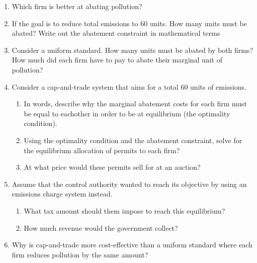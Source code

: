\documentclass[11pt]{article}
\begin{document}
\begin{enumerate}
  \item Which firm is better at abating pollution?
  
  \item If the goal is to reduce total emissions to $60$ units. How many units must be abated? Write out the abatement constraint in mathematical terms
  
  \item Consider a uniform standard. How many units must be abated by both firms? How much did each firm have to pay to abate their marginal unit of pollution?

  \item Consider a cap-and-trade system that aims for a total $60$ units of emissions. 
  \begin{enumerate}
    \item In words, describe why the marginal abatement costs for each firm must be equal to eachother in order to be at equilibrium (the optimality condition). 
    
    \item Using the optimality condition and the abatement constraint, solve for the equilibrium allocation of permits to each firm?

    \item At what price would these permits sell for at an auction?
  \end{enumerate}

  \item Assume that the control authority wanted to reach its objective by using an emissions charge system instead.
  \begin{enumerate}
    \item What tax amount should them impose to reach this equilibrium?
    
    \item How much revenue would the government collect?
  \end{enumerate}

  \item Why is cap-and-trade more cost-effective than a uniform standard where each firm reduces pollution by the same amount?
\end{enumerate}
\end{document}
